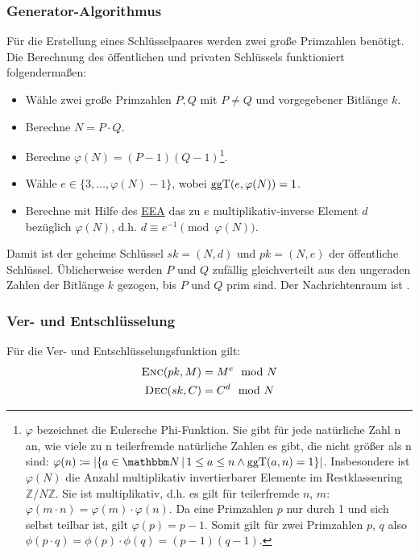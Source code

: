 \subsubsection{Generator-Algorithmus} Für die Erstellung eines
Schlüsselpaares werden zwei große Primzahlen benötigt. Die Berechnung
des öffentlichen und privaten Schlüssels funktioniert folgendermaßen:
\begin{itemize}
\item Wähle zwei große Primzahlen $P, Q$ mit $P \neq Q$ und
  vorgegebener Bitlänge $k$.
\item Berechne $N = P \cdot Q$.
\item Berechne $\varphi(N) = (P - 1)(Q - 1)$\footnote{$\varphi$
    bezeichnet die Eulersche Phi-Funktion\indexEulerPhiFunction. Sie gibt
    für jede natürliche Zahl n an, wie viele zu n teilerfremde natürliche
    Zahlen es gibt, die nicht größer als n sind: $\varphi(n) \coloneqq \vert
    \{a\in\N \, |\, 1 \le a \le n \land \operatorname{ggT}(a,n) = 1 \}
    \vert$. Insbesondere ist $\varphi(N)$ die Anzahl multiplikativ
    invertierbarer Elemente im Restklassenring $\mathbb{Z}/N\mathbb{Z}$.
    Sie ist multiplikativ, d.h. es gilt für teilerfremde $n$, $m$:
    $\varphi(m\cdot n) = \varphi(m) \cdot \varphi(n)$. Da eine Primzahlen
    $p$ nur durch 1 und sich selbst teilbar ist, gilt $\varphi(p) =
    p-1$. Somit gilt für zwei Primzahlen $p$, $q$ also $\phi(p \cdot q) =
    \phi(p) \cdot \phi(q) = (p-1)(q-1)$.}.
\item Wähle $e \in \{3, \dotsc, \varphi(N) - 1\}$, wobei
  $\operatorname{ggT}(e, \varphi(N)) = 1$.
\item Berechne mit Hilfe des \hyperref[ssec:eea]{EEA} das zu $e$
  multiplikativ-inverse Element $d$ bezüglich $\varphi(N)$, d.h. $d \equiv
  e^{-1} \pmod{\varphi(N)}$.
\end{itemize}

Damit ist der geheime Schlüssel $sk = (N, d)$ und $pk = (N, e)$ der
öffentliche Schlüssel. Üblicherweise werden $P$ und $Q$ zufällig
gleichverteilt aus den ungeraden Zahlen der Bitlänge $k$ gezogen, bis
$P$ und $Q$ prim sind. Der Nachrichtenraum ist .
\subsubsection{Ver- und Entschlüsselung} Für die Ver- und
Entschlüsselungsfunktion gilt:
\begin{align*} \textsc{Enc}(pk, M) & = M^e \mod N \\ \textsc{Dec}(sk, C) & = C^d \mod N
\end{align*}

